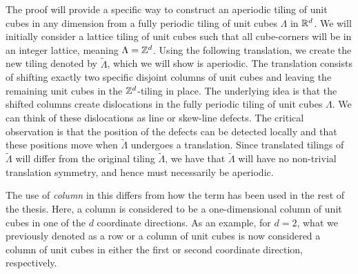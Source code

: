 \documentclass[../thesis.tex]{subfiles}
\begin{document}
The proof will provide a specific way to construct an aperiodic tiling of unit cubes in any dimension from a fully periodic tiling of unit cubes $\Lambda$ in $\mathbb{R}^d$. We will initially consider a lattice tiling of unit cubes such that all cube-corners will be in an integer lattice, meaning $\Lambda = \mathbb{Z}^d$.  Using the following translation, we create the new tiling denoted by $\widetilde{\Lambda}$, which we will show is aperiodic. The translation consists of shifting exactly two specific disjoint columns of unit cubes and leaving the remaining unit cubes in the $\mathbb{Z}^d$-tiling in place. The underlying idea is that the shifted columns create dislocations in the fully periodic tiling of unit cubes $\Lambda$. We can think of these dislocations as line or skew-line defects. The critical observation is that the position of the defects can be detected locally and that these positions move when $\widetilde{\Lambda}$ undergoes a translation. Since translated tilings of $\widetilde{\Lambda}$ will differ from the original tiling $\widetilde{\Lambda}$, we have that $\widetilde{\Lambda}$ will have no non-trivial translation symmetry, and hence must necessarily be aperiodic. 

\begin{remark}
    The use of \emph{column} in this  differs from how the term has been used in the rest of the thesis. Here, a column is considered to be a one-dimensional column of unit cubes in one of the $d$ coordinate directions. As an example, for $d=2$, what we previously denoted as a row or a column of unit cubes is now considered a column of unit cubes in either the first or second coordinate direction, respectively.
\end{remark}
\end{document}

